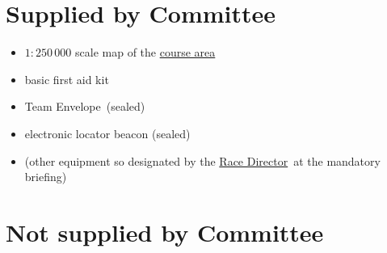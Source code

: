 \documentclass[12pt]{report}
\newcommand{\hyplink}[1]{\hyperlink{#1}{{#1}}}
\newcommand{\coursearea}{\hyplink{course area}}
\newcommand{\RaceDirector}{\hyplink{Race Director}}
\newcommand{\TeamEnvelope}{Team Envelope}
\begin{document}
  \section{Supplied by Committee}
  \begin{itemize}
  \renewcommand\labelitemi{}
  \item $1:250\,000$ scale map of the \coursearea
  \item  basic first aid kit
  \item  \TeamEnvelope\ (sealed)
  \item electronic locator beacon (sealed)
  \item (other equipment so designated by the \RaceDirector\ at the mandatory briefing)
  \end{itemize}
  \section{Not supplied by Committee}
\end{document}
